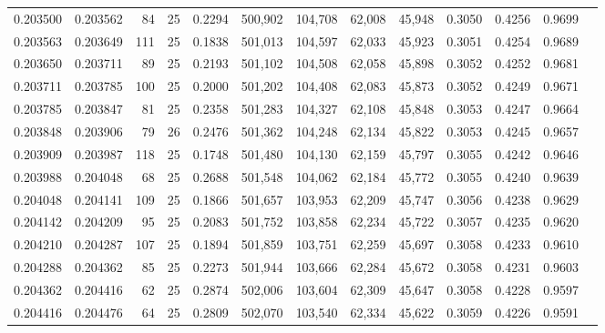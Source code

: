 \begin{tabular}{rrrrrrrrrrrrr}
0.203500 & 0.203562 &    84 &  25 &                                     0.2294 & 500,902 & 104,708 &  62,008 &  45,948 & 0.3050 & 0.4256 & 0.9699 \\
0.203563 & 0.203649 &   111 &  25 &                                     0.1838 & 501,013 & 104,597 &  62,033 &  45,923 & 0.3051 & 0.4254 & 0.9689 \\
0.203650 & 0.203711 &    89 &  25 &                                     0.2193 & 501,102 & 104,508 &  62,058 &  45,898 & 0.3052 & 0.4252 & 0.9681 \\
0.203711 & 0.203785 &   100 &  25 &                                     0.2000 & 501,202 & 104,408 &  62,083 &  45,873 & 0.3052 & 0.4249 & 0.9671 \\
0.203785 & 0.203847 &    81 &  25 &                                     0.2358 & 501,283 & 104,327 &  62,108 &  45,848 & 0.3053 & 0.4247 & 0.9664 \\
0.203848 & 0.203906 &    79 &  26 &                                     0.2476 & 501,362 & 104,248 &  62,134 &  45,822 & 0.3053 & 0.4245 & 0.9657 \\
0.203909 & 0.203987 &   118 &  25 &                                     0.1748 & 501,480 & 104,130 &  62,159 &  45,797 & 0.3055 & 0.4242 & 0.9646 \\
0.203988 & 0.204048 &    68 &  25 &                                     0.2688 & 501,548 & 104,062 &  62,184 &  45,772 & 0.3055 & 0.4240 & 0.9639 \\
0.204048 & 0.204141 &   109 &  25 &                                     0.1866 & 501,657 & 103,953 &  62,209 &  45,747 & 0.3056 & 0.4238 & 0.9629 \\
0.204142 & 0.204209 &    95 &  25 &                                     0.2083 & 501,752 & 103,858 &  62,234 &  45,722 & 0.3057 & 0.4235 & 0.9620 \\
0.204210 & 0.204287 &   107 &  25 &                                     0.1894 & 501,859 & 103,751 &  62,259 &  45,697 & 0.3058 & 0.4233 & 0.9610 \\
0.204288 & 0.204362 &    85 &  25 &                                     0.2273 & 501,944 & 103,666 &  62,284 &  45,672 & 0.3058 & 0.4231 & 0.9603 \\
0.204362 & 0.204416 &    62 &  25 &                                     0.2874 & 502,006 & 103,604 &  62,309 &  45,647 & 0.3058 & 0.4228 & 0.9597 \\
0.204416 & 0.204476 &    64 &  25 &                                     0.2809 & 502,070 & 103,540 &  62,334 &  45,622 & 0.3059 & 0.4226 & 0.9591 \\

\end{tabular}
